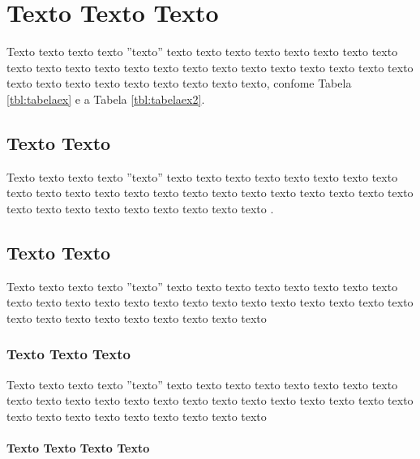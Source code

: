 \chapter{Texto Texto Texto}
\label{chap:outrocapitulo}

Texto texto texto texto ''texto'' texto texto texto texto texto texto texto texto texto texto texto texto texto texto texto texto texto texto texto texto texto texto texto texto texto texto texto texto texto texto texto, confome Tabela \ref{tbl:tabelaex} e a Tabela \ref{tbl:tabelaex2}.





\section{Texto Texto}
\label{sec:section}

Texto texto texto texto ''texto'' texto texto texto texto texto texto texto texto texto texto texto texto texto texto texto texto texto texto texto texto texto texto texto texto texto texto texto texto texto texto texto \cite{gil2002elaborar}.


\section{Texto Texto}
\label{sec:outrasection}

Texto texto texto texto ''texto'' texto texto texto texto texto texto texto texto texto texto texto texto texto texto texto texto texto texto texto texto texto texto texto texto texto texto texto texto texto texto texto

\subsection{Texto Texto Texto}
\label{sub:outrasubsectiona}

Texto texto texto texto ''texto'' texto texto texto texto texto texto texto texto texto texto texto texto texto texto texto texto texto texto texto texto texto texto texto texto texto texto texto texto texto texto texto


\subsubsection{Texto Texto Texto Texto}
\label{subsub:outrasubsubsection}

